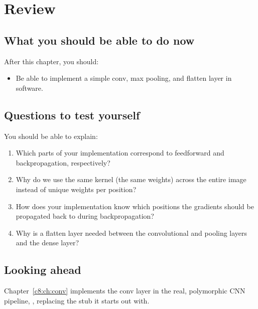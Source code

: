 
\section{Review}
\label{c7:sec:review}

\subsection*{What you should be able to do now}
After this chapter, you should:
\begin{itemize}
  \item Be able to implement a simple conv, max pooling, and flatten layer in software.
\end{itemize}

\subsection*{Questions to test yourself}
You should be able to explain:
\begin{enumerate}
  \item Which parts of your  implementation correspond to feedforward and
    backpropagation, respectively?
  \item Why do we use the same kernel (the same weights) across the entire image instead of unique
    weights per position?
  \item How does your  implementation know which positions the gradients
    should be propagated back to during backpropagation?
  \item Why is a flatten layer needed between the convolutional and pooling layers and the dense
    layer?
\end{enumerate}

\subsection*{Looking ahead}
Chapter~\ref{c8:ch:conv} implements the conv layer in the real, polymorphic CNN pipeline,
, replacing the stub it starts out with.
